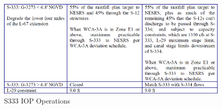 \begin{figure}[!h]
  \begin{center}
  \includegraphics[width=6.5in]{../figs/S333_IOPops.png}
  \caption{S333 IOP Operations}
  \label{fig:S333iop}
  \end{center}
\end{figure}

%
%
%
%




